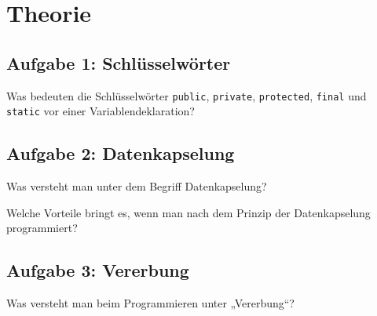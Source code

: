 \section{Theorie}

\subsection{Aufgabe 1: Schlüsselwörter}

Was bedeuten die Schlüsselwörter \lstinline|public|, \lstinline|private|,
\lstinline|protected|, \lstinline|final| und \lstinline|static| vor einer
Variablendeklaration?


\subsection{Aufgabe 2: Datenkapselung}

\begin{compactenum}[a)]
\item Was versteht man unter dem Begriff Datenkapselung?
\item Welche Vorteile bringt es, wenn man nach dem Prinzip der Datenkapselung
programmiert?
\end{compactenum} 


\subsection{Aufgabe 3: Vererbung}

Was versteht man beim Programmieren unter „Vererbung“?
